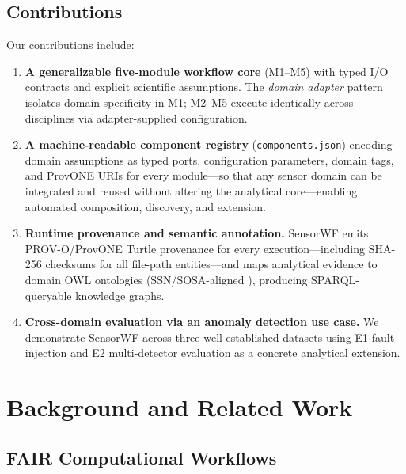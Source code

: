 \documentclass[conference]{IEEEtran}
\begin{document}
\subsection{Contributions}
Our contributions include:
\begin{enumerate}
  \item \textbf{A generalizable five-module workflow core} (M1--M5) with typed I/O contracts and explicit scientific assumptions. The \emph{domain adapter} pattern isolates domain-specificity in M1; M2--M5 execute identically across disciplines via adapter-supplied configuration.
  \item \textbf{A machine-readable component registry} (\texttt{components.json}) encoding domain assumptions as typed ports, configuration parameters, domain tags, and ProvONE URIs for every module---so that any sensor domain can be integrated and reused without altering the analytical core---enabling automated composition, discovery, and extension.
  \item \textbf{Runtime provenance and semantic annotation.} SensorWF emits PROV-O/ProvONE Turtle provenance for every execution---including SHA-256 checksums for all file-path entities---and maps analytical evidence to domain OWL ontologies (SSN/SOSA-aligned \cite{haller2019ssn,compton2012ssn}), producing SPARQL-queryable knowledge graphs.
  \item \textbf{Cross-domain evaluation via an anomaly detection use case.} We demonstrate SensorWF across three well-established datasets using E1 fault injection and E2 multi-detector evaluation as a concrete analytical extension.
\end{enumerate}

\section{Background and Related Work}
\label{sec:background}

\subsection{FAIR Computational Workflows}
\end{document}
